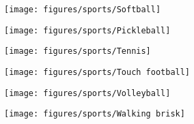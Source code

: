 \documentclass[11pt]{article}
\begin{document}
     \clearpage

     \begin{figure}[htb!]
         \centering

         \begin{subfigure}{.5\textwidth}
             \centering
             \texttt{[image: figures/sports/Softball]}
         \end{subfigure}%
         \hfill
         \begin{subfigure}{.5\textwidth}
             \centering
             \texttt{[image: figures/sports/Pickleball]}
         \end{subfigure}%
         \hfill
         \begin{subfigure}{.5\textwidth}
             \centering
             \texttt{[image: figures/sports/Tennis]}
         \end{subfigure}%
         \hfill
         \begin{subfigure}{.5\textwidth}
             \centering
             \texttt{[image: figures/sports/Touch football]}
         \end{subfigure}%
         \hfill
         \begin{subfigure}{.5\textwidth}
             \centering
             \texttt{[image: figures/sports/Volleyball]}
         \end{subfigure}%
         \hfill
         \begin{subfigure}{.5\textwidth}
             \centering
             \texttt{[image: figures/sports/Walking brisk]}
         \end{subfigure}
     \end{figure}

     \clearpage
\end{document}
